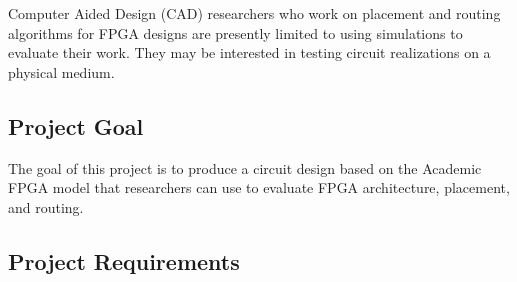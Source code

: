Computer Aided Design (CAD) researchers who work on placement and routing algorithms for FPGA designs are presently limited to using simulations to evaluate their work.
They may be interested in testing circuit realizations on a physical medium.


\subsection{Project Goal}

% 

The goal of this project is to produce a circuit design based on the Academic FPGA model that researchers can use to evaluate FPGA architecture, placement, and routing.



\subsection{Project Requirements}

%


